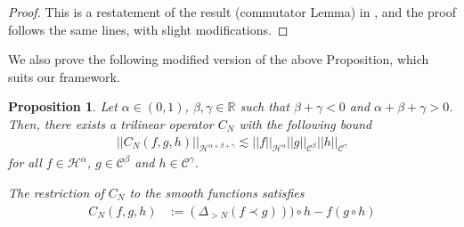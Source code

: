 \documentclass[11pt, oneside]{article}   	%
\newtheorem{proposition}[theorem]{Proposition}
\newcommand{\CC}{\mathscr{C}}
\newcommand{\ssp}{\mathscr{H}}
\begin{document}
\begin{proof}
This is a restatement of the result (commutator Lemma) in \cite{allez_continuous_2015}, and the proof follows the same lines, with slight modifications. 
\end{proof}

We also prove the following modified version of the above Proposition, which suits our framework.

\begin{proposition}
	\label{prop:commu2} Let $\alpha \in (0, 1)$, $\beta, \gamma \in \mathbb{R}$
	such that $\beta + \gamma < 0$ and $\alpha + \beta + \gamma > 0$. 
	Then, there exists a  trilinear operator $C_N$ with the following bound
	\begin{align*}
	|| C_N (f, g, h) ||_{\ssp^{\alpha + \beta + \gamma}} \lesssim || f
	||_{\ssp^{\alpha}} || g ||_{\CC^{\beta}} || h
	||_{\CC^{\gamma}}
	\end{align*}
	for all $f \in \ssp^{\alpha}$, $g \in \CC^{\beta}$ and $h \in
	\CC^{\gamma}$.
	
	The restriction of $C_N$  to the smooth functions satisfies 
	\begin{align*}
	C_N (f, g, h) &:= \left(\Delta_{> N} (f\prec g)\right))\circ h- f(g \circ h)
	\end{align*}
	
\end{proposition}
\end{document}
